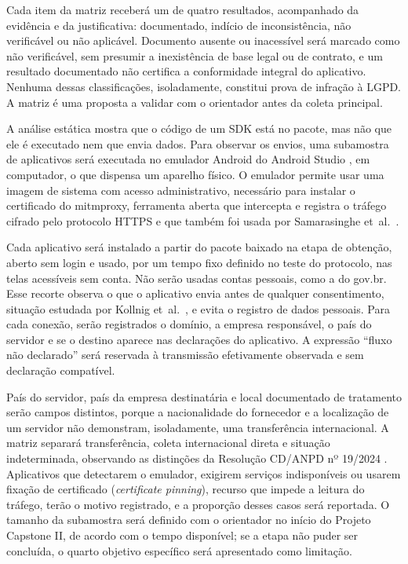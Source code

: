 Cada item da matriz receberá um de quatro resultados, acompanhado da evidência e da justificativa: documentado, indício de inconsistência, não verificável ou não aplicável. Documento ausente ou inacessível será marcado como não verificável, sem presumir a inexistência de base legal ou de contrato, e um resultado documentado não certifica a conformidade integral do aplicativo. Nenhuma dessas classificações, isoladamente, constitui prova de infração à LGPD. A matriz é uma proposta a validar com o orientador antes da coleta principal.

\label{sec:trafego}

A análise estática mostra que o código de um SDK está no pacote, mas não que ele é executado nem que envia dados. Para observar os envios, uma subamostra de aplicativos será executada no emulador Android do Android Studio \cite{androidemulador2026}, em computador, o que dispensa um aparelho físico. O emulador permite usar uma imagem de sistema com acesso administrativo, necessário para instalar o certificado do mitmproxy, ferramenta aberta que intercepta e registra o tráfego cifrado pelo protocolo HTTPS \cite{mitmproxy2026} e que também foi usada por Samarasinghe et~al.~\cite{samarasinghe2022}.

Cada aplicativo será instalado a partir do pacote baixado na etapa de obtenção, aberto sem login e usado, por um tempo fixo definido no teste do protocolo, nas telas acessíveis sem conta. Não serão usadas contas pessoais, como a do gov.br. Esse recorte observa o que o aplicativo envia antes de qualquer consentimento, situação estudada por Kollnig et~al.~\cite{kollnig2021fait}, e evita o registro de dados pessoais. Para cada conexão, serão registrados o domínio, a empresa responsável, o país do servidor e se o destino aparece nas declarações do aplicativo. A expressão ``fluxo não declarado'' será reservada à transmissão efetivamente observada e sem declaração compatível.

País do servidor, país da empresa destinatária e local documentado de tratamento serão campos distintos, porque a nacionalidade do fornecedor e a localização de um servidor não demonstram, isoladamente, uma transferência internacional. A matriz separará transferência, coleta internacional direta e situação indeterminada, observando as distinções da Resolução CD/ANPD nº 19/2024 \cite{anpd2024}. Aplicativos que detectarem o emulador, exigirem serviços indisponíveis ou usarem fixação de certificado (\emph{certificate pinning}), recurso que impede a leitura do tráfego, terão o motivo registrado, e a proporção desses casos será reportada. O tamanho da subamostra será definido com o orientador no início do Projeto Capstone II, de acordo com o tempo disponível; se a etapa não puder ser concluída, o quarto objetivo específico será apresentado como limitação.

